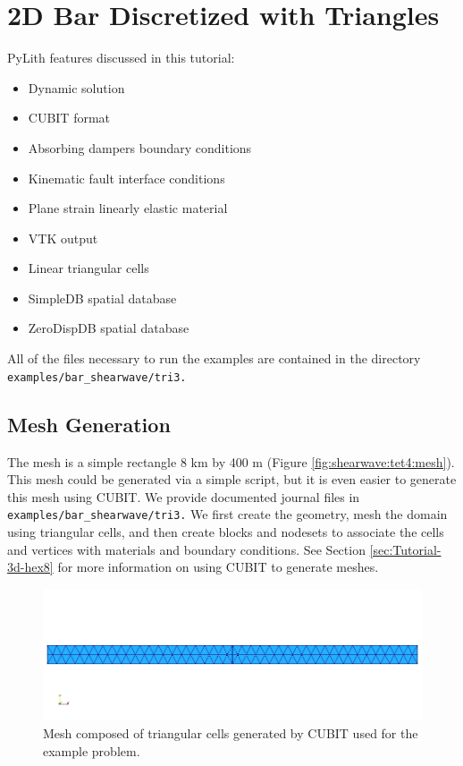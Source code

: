 
\section{\label{sec:tutorial:shearwave:tri3}2D Bar Discretized with Triangles}

PyLith features discussed in this tutorial:
\begin{itemize}
\item Dynamic solution
\item CUBIT format
\item Absorbing dampers boundary conditions
\item Kinematic fault interface conditions
\item Plane strain linearly elastic material
\item VTK output
\item Linear triangular cells
\item SimpleDB spatial database
\item ZeroDispDB spatial database
\end{itemize}
All of the files necessary to run the examples are contained in the
directory \texttt{examples/bar\_shearwave/tri3.}


\subsection{Mesh Generation}

The mesh is a simple rectangle 8 km by 400 m (Figure \vref{fig:shearwave:tet4:mesh}).
This mesh could be generated via a simple script, but it is even easier
to generate this mesh using CUBIT. We provide documented journal files
in \texttt{examples/bar\_shearwave/tri3.} We first create the geometry,
mesh the domain using triangular cells, and then create blocks and
nodesets to associate the cells and vertices with materials and boundary
conditions. See Section \vref{sec:Tutorial-3d-hex8} for more information
on using CUBIT to generate meshes.

\noindent \begin{center}
\begin{figure}
\begin{centering}
\includegraphics[scale=0.5]{tutorials/shearwave/figs/tri3mesh}
\par\end{centering}

\caption{Mesh composed of triangular cells generated by CUBIT used for the
example problem.\label{fig:shearwave:tri3:mesh}}
\end{figure}

\par\end{center}


